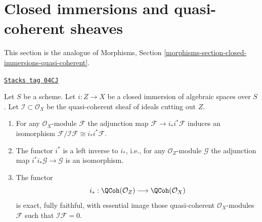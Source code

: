 \section{Closed immersions and quasi-coherent sheaves}
\label{spaces-morphisms-section-closed-immersions-quasi-coherent}
This section is the analogue of
Morphisms, Section \ref{morphisms-section-closed-immersions-quasi-coherent}.

\begin{lemma}
\label{spaces-morphisms-lemma-i-star-equivalence}
\href{https://stacks.math.columbia.edu/tag/04CJ}{\texttt{Stacks tag 04CJ}}

Let $S$ be a scheme. Let $i : Z \to X$ be a closed immersion of algebraic
spaces over $S$. Let $\mathcal{I} \subset \mathcal{O}_X$ be the quasi-coherent
sheaf of ideals cutting out $Z$.
\begin{enumerate}
\item For any $\mathcal{O}_X$-module $\mathcal{F}$ the adjunction map
$\mathcal{F} \to i_*i^*\mathcal{F}$ induces an isomorphism
$\mathcal{F}/\mathcal{I}\mathcal{F} \cong i_*i^*\mathcal{F}$.
\item The functor $i^*$ is a left inverse to $i_*$, i.e., for any
$\mathcal{O}_Z$-module $\mathcal{G}$ the adjunction map
$i^*i_*\mathcal{G} \to \mathcal{G}$ is an isomorphism.
\item The functor
$$
i_* :
\QCoh(\mathcal{O}_Z)
\longrightarrow
\QCoh(\mathcal{O}_X)
$$
is exact, fully faithful, with essential image those quasi-coherent
$\mathcal{O}_X$-modules $\mathcal{F}$ such that $\mathcal{I}\mathcal{F} = 0$.
\end{enumerate}
\end{lemma}

